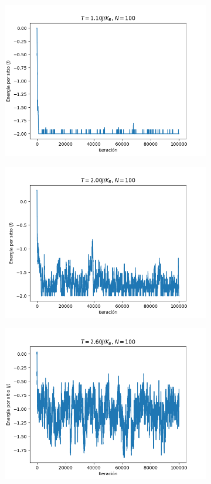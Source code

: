 \documentclass{article}
\begin{document}
\begin{figure}
\centering
\begin{subfigure}{0.65\textwidth}
\includegraphics[width=\textwidth]{energia_200.png}
\end{subfigure}
\begin{subfigure}{0.65\textwidth}
\includegraphics[width=\textwidth]{energia_500.png}
\end{subfigure}
\begin{subfigure}{0.65\textwidth}
\includegraphics[width=\textwidth]{energia_700.png}

\end{subfigure}
\end{figure}
\end{document}
